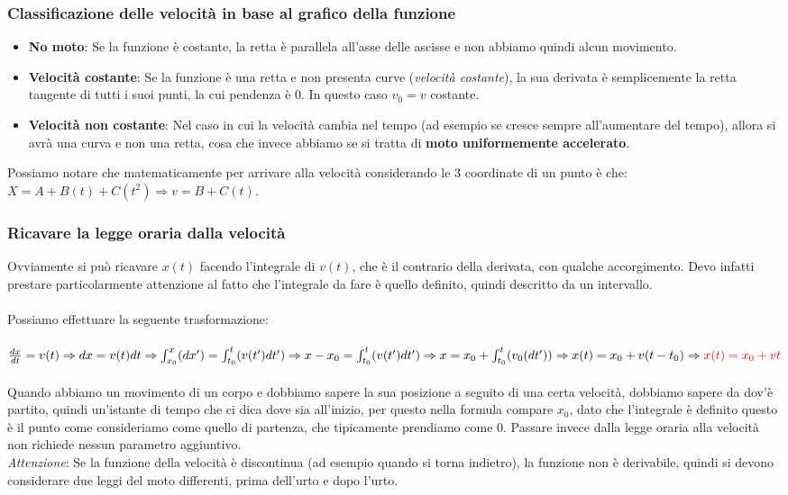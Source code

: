 \documentclass[a4paper,12pt]{report}
\begin{document}
	\subsubsection{Classificazione delle velocità in base al grafico della funzione}
	\begin{itemize}
		\item \textbf{No moto}: Se la funzione è costante, la retta è parallela all'asse delle ascisse e non abbiamo quindi alcun movimento.
		\item \textbf{Velocità costante}: Se la funzione è una retta e non presenta curve (\textit{velocità costante}), la sua derivata è semplicemente la retta tangente di tutti i suoi punti, la cui pendenza è 0. In questo caso ${v_0 = v}$ costante.
		\item \textbf{Velocità non costante}: Nel caso in cui la velocità cambia nel tempo (ad esempio se cresce sempre all'aumentare del tempo), allora si avrà una curva e non una retta, cosa che invece abbiamo se si tratta di \textbf{moto uniformemente accelerato}.
	\end{itemize}
	Possiamo notare che matematicamente per arrivare alla velocità considerando le 3 coordinate di un punto è che: ${{X = A + B(t) + C(t^2)} \Rightarrow {v = B + C(t)}}$.
	\subsubsection{Ricavare la legge oraria dalla velocità}
	Ovviamente si può ricavare $x(t)$ facendo l'integrale di $v(t)$, che è il contrario della derivata, con qualche accorgimento. Devo infatti prestare particolarmente attenzione al fatto che l'integrale da fare è quello definito, quindi descritto da un intervallo.\\\\
	Possiamo effettuare la seguente trasformazione:\\\\
	${\frac{dx}{dt} = v(t)}\Rightarrow\\{{dx} = {v(t)dt}} \Rightarrow\\{\int_{x_0}^{x}(dx')} = {\int_{t_0}^{t}(v(t')dt')} \Rightarrow\\{x-x_0} = {\int_{t_0}^{t}(v(t')dt')}\Rightarrow\\{x} = {x_0} + {\int_{t_0}^{t}(v_0(dt'))}\Rightarrow\\x(t) = x_0 + v(t-t_0)\Rightarrow \mathcolor{red}{x(t) = x_0 + vt}$\\\\
	Quando abbiamo un movimento di un corpo e dobbiamo sapere la sua posizione a seguito di una certa velocità, dobbiamo sapere da dov'è partito, quindi un'istante di tempo che ci dica dove sia all'inizio, per questo nella formula compare $x_0$, dato che l'integrale è definito questo è il punto come consideriamo come quello di partenza, che tipicamente prendiamo come $0$. Passare invece dalla legge oraria alla velocità non richiede nessun parametro aggiuntivo.\\ \textit{Attenzione}: Se la funzione della velocità è discontinua (ad esempio quando si torna indietro), la funzione non è derivabile, quindi si devono considerare due leggi del moto differenti, prima dell'urto e dopo l'urto.
\end{document}
